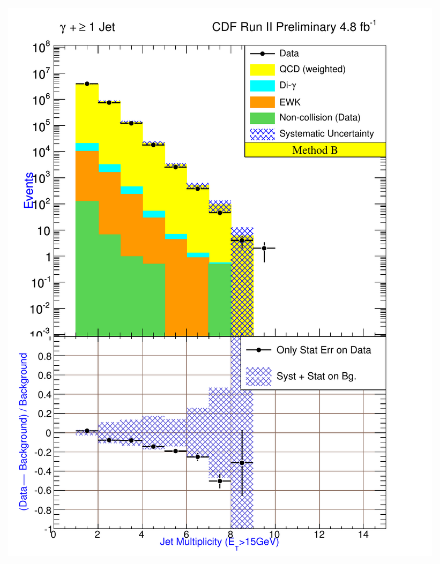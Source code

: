 \documentclass[12pt,twoside,letterpaper,doublespace]{article}
\begin{document}
\begin{figure}[h!]
{\includegraphics[keepaspectratio=true, scale=\figScale]{G30Jets_MtdB_plot1_NJet.pdf}}

\end{figure}
\end{document}
